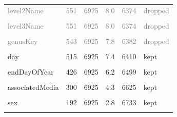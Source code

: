 \documentclass[sn-apa,pdflatex]{sn-jnl}
\begin{document}
\begin{longtable}[t]{lrrrrl}
\textcolor{gray}{level2Name} & \textcolor{gray}{551} & \textcolor{gray}{6925} & \textcolor{gray}{8.0} & \textcolor{gray}{6374} & \textcolor{gray}{dropped}\\
\addlinespace
\textcolor{gray}{\cellcolor{gray!10}{level3Gid}} & \textcolor{gray}{\cellcolor{gray!10}{551}} & \textcolor{gray}{\cellcolor{gray!10}{6925}} & \textcolor{gray}{\cellcolor{gray!10}{8.0}} & \textcolor{gray}{\cellcolor{gray!10}{6374}} & \textcolor{gray}{\cellcolor{gray!10}{dropped}}\\
\textcolor{gray}{level3Name} & \textcolor{gray}{551} & \textcolor{gray}{6925} & \textcolor{gray}{8.0} & \textcolor{gray}{6374} & \textcolor{gray}{dropped}\\
\textcolor{gray}{\cellcolor{gray!10}{iucnRedListCategory}} & \textcolor{gray}{\cellcolor{gray!10}{551}} & \textcolor{gray}{\cellcolor{gray!10}{6925}} & \textcolor{gray}{\cellcolor{gray!10}{8.0}} & \textcolor{gray}{\cellcolor{gray!10}{6374}} & \textcolor{gray}{\cellcolor{gray!10}{dropped}}\\
\textcolor{gray}{genusKey} & \textcolor{gray}{543} & \textcolor{gray}{6925} & \textcolor{gray}{7.8} & \textcolor{gray}{6382} & \textcolor{gray}{dropped}\\
\textcolor{gray}{\cellcolor{gray!10}{speciesKey}} & \textcolor{gray}{\cellcolor{gray!10}{540}} & \textcolor{gray}{\cellcolor{gray!10}{6925}} & \textcolor{gray}{\cellcolor{gray!10}{7.8}} & \textcolor{gray}{\cellcolor{gray!10}{6385}} & \textcolor{gray}{\cellcolor{gray!10}{dropped}}\\
\addlinespace
day & 515 & 6925 & 7.4 & 6410 & kept\\
\cellcolor{gray!10}{startDayOfYear} & \cellcolor{gray!10}{426} & \cellcolor{gray!10}{6925} & \cellcolor{gray!10}{6.2} & \cellcolor{gray!10}{6499} & \cellcolor{gray!10}{kept}\\
endDayOfYear & 426 & 6925 & 6.2 & 6499 & kept\\
\cellcolor{gray!10}{geodeticDatum} & \cellcolor{gray!10}{307} & \cellcolor{gray!10}{6925} & \cellcolor{gray!10}{4.4} & \cellcolor{gray!10}{6618} & \cellcolor{gray!10}{kept}\\
associatedMedia & 300 & 6925 & 4.3 & 6625 & kept\\
\addlinespace
\cellcolor{gray!10}{verbatimElevation} & \cellcolor{gray!10}{287} & \cellcolor{gray!10}{6925} & \cellcolor{gray!10}{4.1} & \cellcolor{gray!10}{6638} & \cellcolor{gray!10}{kept}\\
sex & 192 & 6925 & 2.8 & 6733 & kept\\
\textcolor{gray}{\cellcolor{gray!10}{depth}} & \textcolor{gray}{\cellcolor{gray!10}{117}} & \textcolor{gray}{\cellcolor{gray!10}{6925}} & \textcolor{gray}{\cellcolor{gray!10}{1.7}} & \textcolor{gray}{\cellcolor{gray!10}{6808}} & \textcolor{gray}{\cellcolor{gray!10}{dropped}}\\

\end{longtable}
\end{document}
